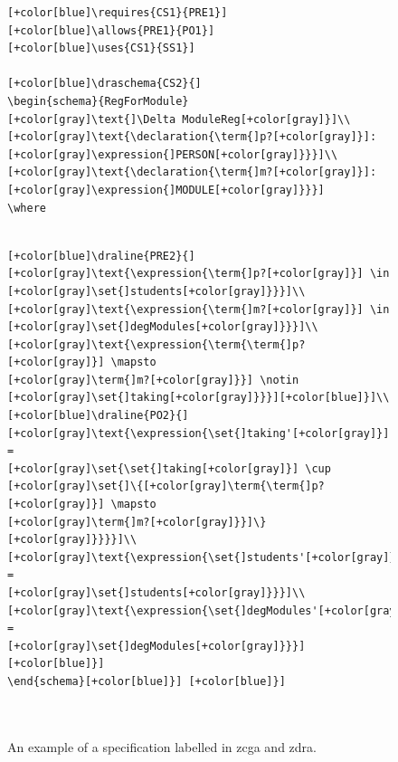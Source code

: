 \begin{figure}[H]
\begin{minipage}{0.45\textwidth}
\begin{tiny}
\begin{BVerbatim}[commandchars=+\[\]]
[+color[blue]\requires{CS1}{PRE1}] [+color[blue]\allows{PRE1}{PO1}]
[+color[blue]\uses{CS1}{SS1}]

[+color[blue]\draschema{CS2}{]
\begin{schema}{RegForModule}
[+color[gray]\text{]\Delta ModuleReg[+color[gray]}]\\
[+color[gray]\text{\declaration{\term{]p?[+color[gray]}]:
[+color[gray]\expression{]PERSON[+color[gray]}}}]\\
[+color[gray]\text{\declaration{\term{]m?[+color[gray]}]:
[+color[gray]\expression{]MODULE[+color[gray]}}}]
\where


\end{BVerbatim}
\end{tiny}
\caption{An example of a specification labelled in \gls{zcga} and \gls{zdra}.\label{fig:zdrazcgaAno}}
\end{minipage}\hfill
\begin{minipage}{0.45\textwidth}
\centering
\begin{tiny}
\begin{BVerbatim}[commandchars=+\[\]]
[+color[blue]\draline{PRE2}{]
[+color[gray]\text{\expression{\term{]p?[+color[gray]}] \in
[+color[gray]\set{]students[+color[gray]}}}]\\
[+color[gray]\text{\expression{\term{]m?[+color[gray]}] \in
[+color[gray]\set{]degModules[+color[gray]}}}]\\
[+color[gray]\text{\expression{\term{\term{]p?[+color[gray]}] \mapsto
[+color[gray]\term{]m?[+color[gray]}}] \notin
[+color[gray]\set{]taking[+color[gray]}}}][+color[blue]}]\\
[+color[blue]\draline{PO2}{]
[+color[gray]\text{\expression{\set{]taking'[+color[gray]}] =
[+color[gray]\set{\set{]taking[+color[gray]}] \cup
[+color[gray]\set{]\{[+color[gray]\term{\term{]p?[+color[gray]}] \mapsto
[+color[gray]\term{]m?[+color[gray]}}]\}[+color[gray]}}}}]\\
[+color[gray]\text{\expression{\set{]students'[+color[gray]}] =
[+color[gray]\set{]students[+color[gray]}}}]\\
[+color[gray]\text{\expression{\set{]degModules'[+color[gray]}] =
[+color[gray]\set{]degModules[+color[gray]}}}][+color[blue]}]
\end{schema}[+color[blue]}] [+color[blue]}]



\end{BVerbatim}
\end{tiny}
\end{minipage}
\end{figure}
